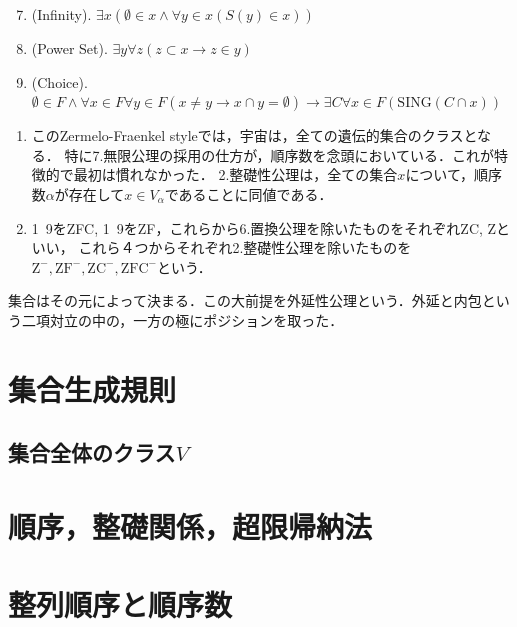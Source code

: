 \documentclass[uplatex, dvipdfmx]{jsreport}
\begin{document}
\begin{shadebox}
\begin{definition}[集合の公理系ZF]
\begin{screen}
\begin{notation}
            \end{notation}
        \end{screen}
        \begin{enumerate}\setcounter{enumi}{6}
            \item (Infinity). $\exists x(\emptyset\in x\land \forall y\in x(S(y)\in x))$
            \item (Power Set). $\exists y\forall z(z\subset x\rightarrow z\in y)$
            \item (Choice). $\emptyset\in F\land\forall x\in F\forall y\in F(x\ne y\rightarrow x\cap y=\emptyset)\rightarrow \exists C\forall x\in F(\mathrm{SING}(C\cap x))$
        \end{enumerate}
    \end{definition}
\end{shadebox}
\begin{remark}\mbox{}
    \begin{enumerate}
        \item このZermelo-Fraenkel styleでは，宇宙は，全ての遺伝的集合のクラスとなる．
        特に7.無限公理の採用の仕方が，順序数を念頭においている．これが特徴的で最初は慣れなかった．
        2.整礎性公理は，全ての集合$x$について，順序数$\alpha$が存在して$x\in V_\alpha$であることに同値である．
        \item 1~9をZFC, 1~9をZF，これらから6.置換公理を除いたものをそれぞれZC, Zといい，
        これら４つからそれぞれ2.整礎性公理を除いたものを$\mathrm{Z^-,ZF^-,ZC^-,ZFC^-}$という．
    \end{enumerate} 
\end{remark}

集合はその元によって決まる．この大前提を外延性公理という．外延と内包という二項対立の中の，一方の極にポジションを取った．

\section{集合生成規則}

\subsection{集合全体のクラス$V$}

\section{順序，整礎関係，超限帰納法}

\section{整列順序と順序数}
\end{document}
